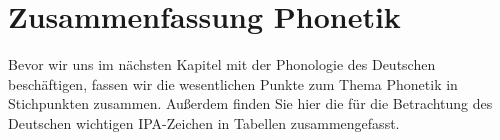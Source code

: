\section{Zusammenfassung Phonetik}\label{sec:ZusfassKons}
\largerpage
\begin{table}[b]
    \centering
        \caption{\label{tab:IPA_Kons} Standarddeutsches Konsonanteninventar (inklusive Allophonen). Spalten: Artikulationsorte. Zeilen: Artikulationsarten: Stimmlose Konsonanten stehen links in einer Zelle, stimmhafte stehen rechts.}
\end{table}
Bevor wir uns im nächsten Kapitel mit der Phonologie des Deutschen beschäftigen, fassen wir die wesentlichen Punkte zum Thema Phonetik in Stichpunkten zusammen. Außerdem finden Sie hier die für die Betrachtung des Deutschen wichtigen IPA-Zeichen in Tabellen zusammengefasst.
